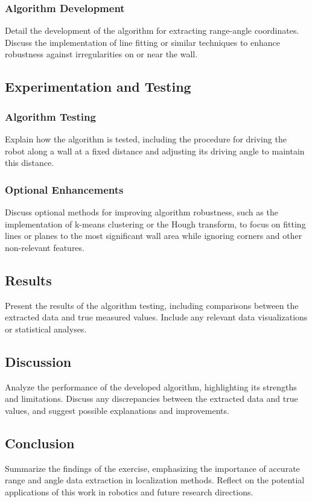 \documentclass[12pt,a4paper]{article}
\begin{document}
	
	\subsubsection{Algorithm Development}
	Detail the development of the algorithm for extracting range-angle coordinates. Discuss the implementation of line fitting or similar techniques to enhance robustness against irregularities on or near the wall.
	
	\subsection{Experimentation and Testing}
	\subsubsection{Algorithm Testing}
	Explain how the algorithm is tested, including the procedure for driving the robot along a wall at a fixed distance and adjusting its driving angle to maintain this distance.
	
	\subsubsection{Optional Enhancements}
	Discuss optional methods for improving algorithm robustness, such as the implementation of k-means clustering or the Hough transform, to focus on fitting lines or planes to the most significant wall area while ignoring corners and other non-relevant features.
	
	\subsection{Results}
	Present the results of the algorithm testing, including comparisons between the extracted data and true measured values. Include any relevant data visualizations or statistical analyses.
	
	\subsection{Discussion}
	Analyze the performance of the developed algorithm, highlighting its strengths and limitations. Discuss any discrepancies between the extracted data and true values, and suggest possible explanations and improvements.
	
	\subsection{Conclusion}
	Summarize the findings of the exercise, emphasizing the importance of accurate range and angle data extraction in localization methods. Reflect on the potential applications of this work in robotics and future research directions.
	
\end{document}
